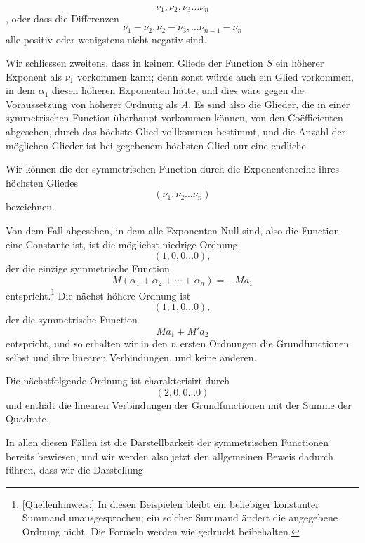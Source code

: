 \[
 \nu_1,\nu_2,\nu_3\ldots\nu_n
\]
, oder dass die Differenzen
\[
 \nu_1-\nu_2,\nu_2-\nu_3,\ldots\nu_{n-1}-\nu_n
\]
alle positiv oder wenigstens nicht negativ sind.

Wir schliessen zweitens, dass in keinem Gliede der Function $S$ ein höherer Exponent als $\nu_1$ vorkommen kann; denn sonst würde auch ein Glied vorkommen, in dem $\alpha_1$ diesen höheren Exponenten hätte, und dies wäre gegen die Voraussetzung von höherer Ordnung als $A$. Es sind also die Glieder, die in einer symmetrischen Function überhaupt vorkommen können, von den Coëfficienten abgesehen, durch das höchste Glied vollkommen bestimmt, und die Anzahl der möglichen Glieder ist bei gegebenem höchsten Glied nur eine endliche.

Wir können die  der symmetrischen Function durch die Exponentenreihe ihres höchsten Gliedes
\[
 (\nu_1,\nu_2\ldots\nu_n)
\]
bezeichnen.

Von dem Fall abgesehen, in dem alle Exponenten Null sind, also die Function eine Constante ist, ist die möglichst niedrige Ordnung
\[
 (1,0,0\ldots0),
\]
der die einzige symmetrische Function
\[
 M(\alpha_1+\alpha_2+\cdots+\alpha_n)=-Ma_1
\]
entspricht.\begingroup\renewcommand{\thefootnote}{E2}\footnote[1]{[Quellenhinweis:] In diesen Beispielen bleibt ein beliebiger konstanter Summand unausgesprochen; ein solcher Summand ändert die angegebene Ordnung nicht. Die Formeln werden wie gedruckt beibehalten.}\endgroup{} Die nächst höhere Ordnung ist
\[
 (1,1,0\ldots0),
\]
der die symmetrische Function
\[
 Ma_1+M'a_2
\]
entspricht, und so erhalten wir in den $n$ ersten Ordnungen die Grundfunctionen selbst und ihre linearen Verbindungen, und keine anderen.

Die nächstfolgende Ordnung ist charakterisirt durch
\[
 (2,0,0\ldots0)
\]
und enthält die linearen Verbindungen der Grundfunctionen mit der Summe der Quadrate.

In allen diesen Fällen ist die Darstellbarkeit der symmetrischen Functionen bereits bewiesen, und wir werden also jetzt den allgemeinen Beweis dadurch führen, dass wir die Darstellung
